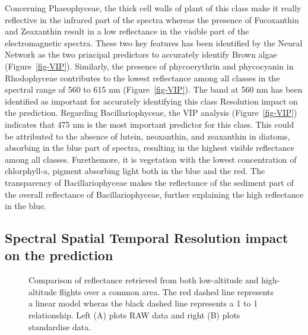 \documentclass[
  number]{elsarticle}
\begin{document}
Concerning Phaeophyceae, the thick cell walls of plant of this class
make it really reflective in the infrared part of the spectra whereas
the presence of Fucoxanthin and Zeaxanthin result in a low reflectance
in the visible part of the electromagnetic spectra. These two key
features has been identified by the Neural Network as the two principal
predictors to accurately identify Brown algae (Figure~\ref{fig-VIP}).
Similarly, the presence of phycoerythrin and phycocyanin in Rhodophyceae
contributes to the lowest reflectance among all classes in the spectral
range of 560 to 615 nm (Figure~\ref{fig-VIP}). The band at 560 nm has
been identified as important for accurately identifying this class
Resolution impact on the prediction. Regarding Bacillariophyceae, the
VIP analysis (Figure~\ref{fig-VIP}) indicates that 475 nm is the most
important predictor for this class. This could be attributed to the
absence of lutein, neoxanthin, and zeaxanthin in diatoms, absorbing in
the blue part of spectra, resulting in the highest visible reflectance
among all classes. Furethemore, it is vegetation with the lowest
concentration of chlorphyll-a, pigment absorbing light both in the blue
and the red. The transparency of Bacillariophyceae makes the reflectance
of the sediment part of the overall reflectance of Bacillariophyceae,
further explaining the high reflectance in the blue.

\subsection{Spectral Spatial Temporal Resolution impact on the
prediction}\label{spectral-spatial-temporal-resolution-impact-on-the-prediction}

\label{cell-fig-CompareRef}
\begin{figure}[H]


\caption{\label{fig-CompareRef}Comparison of reflectance retrieved from
both low-altitude and high-altitude flights over a common area. The red
dashed line represents a linear model wheras the black dashed line
represents a 1 to 1 relationship. Left (A) plots RAW data and right (B)
plots standardise data.}

\end{figure}%
\end{document}
